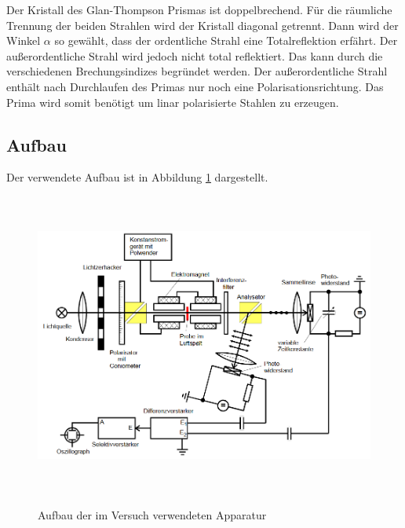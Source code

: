 Der Kristall des Glan-Thompson Prismas ist doppelbrechend.
Für die räumliche Trennung der beiden Strahlen wird der Kristall diagonal
getrennt. Dann wird der Winkel $\alpha$ so gewählt, dass der ordentliche Strahl
eine Totalreflektion erfährt. Der außerordentliche Strahl wird jedoch nicht
total reflektiert. Das kann durch die verschiedenen Brechungsindizes begründet
werden. Der außerordentliche Strahl enthält nach Durchlaufen des Primas nur noch
eine Polarisationsrichtung. Das Prima wird somit benötigt um linar polarisierte
Stahlen zu erzeugen.

\subsection{Aufbau}
Der verwendete Aufbau ist in Abbildung \ref{fig:aufbau} dargestellt.

\begin{figure}[H]
  \centering
  \includegraphics[width=14cm, height=10cm]{aufbau.png}
  \caption{Aufbau der im Versuch verwendeten Apparatur}
  \label{fig:aufbau}
  \cite{skript}
\end{figure}

